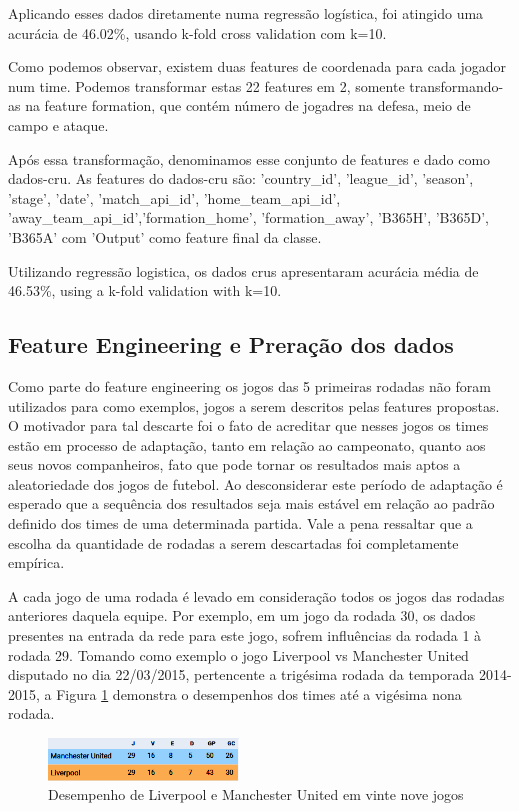 \documentclass{article}
\begin{document}
Aplicando esses dados diretamente numa regressão logística, foi atingido uma acurácia de 46.02\%, usando k-fold cross validation com k=10.

Como podemos observar, existem duas features de coordenada para cada jogador num time. Podemos transformar estas 22 features em 2, somente transformando-as na feature formation, que contém número de jogadres na defesa, meio de campo e ataque.

Após essa transformação, denominamos esse conjunto de features e dado como dados-cru. As features do dados-cru são: 'country\_id', 'league\_id', 'season', 'stage', 'date', 'match\_api\_id', 'home\_team\_api\_id', 'away\_team\_api\_id','formation\_home', 'formation\_away', 'B365H', 'B365D', 'B365A' com 'Output' como feature final da classe.

Utilizando regressão logistica, os dados crus apresentaram acurácia média de  46.53\%, using a k-fold validation with k=10.

\subsection{Feature Engineering e Preração dos dados}

Como parte do feature engineering os jogos das 5 primeiras rodadas não foram utilizados para como exemplos, jogos a serem descritos pelas features propostas. O motivador para tal descarte foi o fato de acreditar que nesses jogos os times estão em processo de adaptação, tanto em relação ao campeonato, quanto aos seus novos companheiros, fato que pode tornar os resultados mais aptos a aleatoriedade dos jogos de futebol. Ao desconsiderar este período de adaptação é esperado que a sequência dos resultados seja mais estável em relação ao padrão definido dos times de uma determinada partida. Vale a pena ressaltar que a escolha da quantidade de rodadas
a serem descartadas foi completamente empírica.

A cada jogo de uma rodada é levado em consideração todos os jogos das rodadas
anteriores daquela equipe. Por exemplo, em um jogo da rodada 30, os dados presentes na entrada da rede para este jogo, sofrem influências da rodada 1 à rodada 29.
Tomando como exemplo o jogo Liverpool vs Manchester United disputado no dia 22/03/2015, pertencente a trigésima rodada da temporada 2014-2015, a Figura \ref{fig:ex_rodada29}
demonstra o desempenhos dos times até a vigésima nona rodada.

\begin{figure}[!h]
	\centering
	\includegraphics[width=0.45\textwidth]{./04-figuras/Exemplo_Rodada29_2.png}
	\caption{Desempenho de Liverpool e Manchester United em vinte nove jogos}
	\label{fig:ex_rodada29}
\end{figure}
\end{document}
